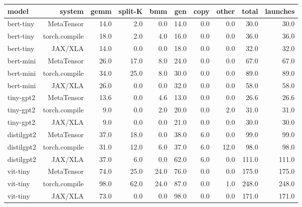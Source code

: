 \begin{tabular}{lrrrrrrrrr}
\toprule
model & system & gemm & split-K & bmm & gen & copy & other & total & launches \\
\midrule
bert-tiny & MetaTensor & 14.0 & 2.0 & 0.0 & 14.0 & 0.0 & 0.0 & 30.0 & 30.0 \\
bert-tiny & torch.compile & 18.0 & 2.0 & 4.0 & 16.0 & 0.0 & 0.0 & 36.0 & 36.0 \\
bert-tiny & JAX/XLA & 14.0 & 0.0 & 0.0 & 18.0 & 0.0 & 0.0 & 32.0 & 32.0 \\
bert-mini & MetaTensor & 26.0 & 17.0 & 8.0 & 24.0 & 0.0 & 0.0 & 67.0 & 67.0 \\
bert-mini & torch.compile & 34.0 & 25.0 & 8.0 & 30.0 & 0.0 & 0.0 & 89.0 & 89.0 \\
bert-mini & JAX/XLA & 26.0 & 0.0 & 0.0 & 32.0 & 0.0 & 0.0 & 58.0 & 58.0 \\
tiny-gpt2 & MetaTensor & 13.6 & 0.0 & 4.6 & 13.0 & 0.0 & 0.0 & 26.6 & 26.6 \\
tiny-gpt2 & torch.compile & 9.0 & 0.0 & 2.0 & 20.0 & 0.0 & 2.0 & 31.0 & 31.0 \\
tiny-gpt2 & JAX/XLA & 9.0 & 0.0 & 0.0 & 21.0 & 0.0 & 0.0 & 30.0 & 30.0 \\
distilgpt2 & MetaTensor & 37.0 & 18.0 & 0.0 & 38.0 & 6.0 & 0.0 & 99.0 & 99.0 \\
distilgpt2 & torch.compile & 31.0 & 12.0 & 6.0 & 37.0 & 6.0 & 12.0 & 98.0 & 98.0 \\
distilgpt2 & JAX/XLA & 37.0 & 6.0 & 0.0 & 62.0 & 6.0 & 0.0 & 111.0 & 111.0 \\
vit-tiny & MetaTensor & 74.0 & 25.0 & 24.0 & 76.0 & 0.0 & 0.0 & 175.0 & 175.0 \\
vit-tiny & torch.compile & 98.0 & 62.0 & 24.0 & 87.0 & 0.0 & 1.0 & 248.0 & 248.0 \\
vit-tiny & JAX/XLA & 73.0 & 0.0 & 0.0 & 98.0 & 0.0 & 0.0 & 171.0 & 171.0 \\
\bottomrule
\end{tabular}
